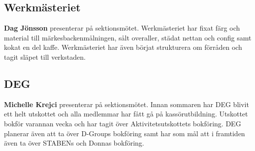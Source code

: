 \documentclass[../protokoll_hostmote_2021.tex]{subfiles}
\begin{document}
\subsection{Werkmästeriet}
\textbf{Dag Jönsson} presenterar på sektionsmötet.
Werkmästeriet har fixat färg och material till märkesbackenmålningen, sålt overaller, städat nettan och config samt kokat en del kaffe. Werkmästeriet har även börjat strukturera om förråden och tagit släpet till verkstaden.
\subsection{DEG}
\textbf{Michelle Krejci} presenterar på sektionsmötet.
Innan sommaren har DEG blivit ett helt utskottet och alla medlemmar har fått gå på kassörutbildning. Utskottet bokför varannan vecka och har tagit över Aktivitetsutskottets bokföring. DEG planerar även att ta över D-Groups bokföring samt har som mål att i framtiden även ta över STABENs och Donnas bokföring.
\end{document}
